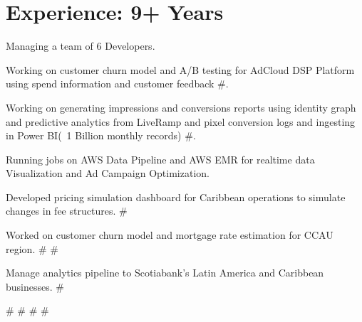 \documentclass[]{Vishnu-Resume}
\begin{document}
\begin{minipage}[t]{0.66\textwidth} 


\section{Experience: 9+ Years}
\sectionsep
\sectionsep
\sectionsep
\sectionsep
\sectionsep
{}
\descript{}
\sectionsep
\sectionsep
\sectionsep
\sectionsep
\sectionsep
\sectionsep
\sectionsep
\sectionsep
\sectionsep
\sectionsep
\sectionsep
\sectionsep
\sectionsep
\sectionsep
\sectionsep
\begin{tightemize}
\item Managing a team of 6 Developers.
\item Working on customer churn model and A/B testing for AdCloud DSP Platform using spend information and customer feedback  \#.
\item Working on generating impressions and conversions reports using identity graph and predictive analytics from LiveRamp and pixel conversion logs and ingesting in Power BI(~1 Billion monthly records)  \#.
\item Running jobs on AWS Data Pipeline and AWS EMR for realtime data Visualization and Ad Campaign Optimization.
\end{tightemize}
\sectionsep
\sectionsep
\sectionsep
{}
\descript{}
\begin{tightemize}
\item Developed pricing simulation dashboard for Caribbean operations to simulate changes in fee structures. \#
\item Worked on customer churn model and mortgage rate estimation for CCAU region.  \# \#
\item Manage analytics pipeline to Scotiabank's Latin America and Caribbean businesses. \#
\end{tightemize}
\#  \# \#  \#
\sectionsep


\end{minipage}
\end{document}
